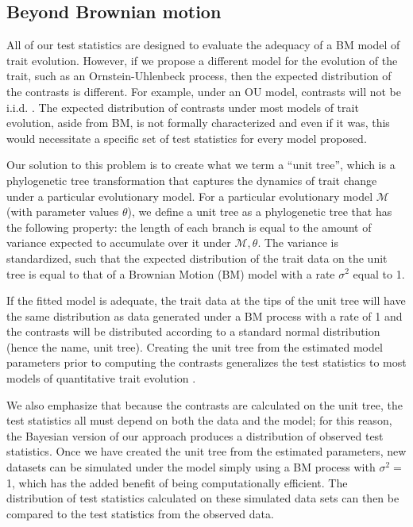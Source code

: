\subsection*{Beyond Brownian motion}

All of our test statistics are designed to evaluate the adequacy of a BM model of trait evolution. However, if we propose a different model for the evolution of the trait, such as an Ornstein-Uhlenbeck \citep[OU;][]{Hansen1997} process, then the expected distribution of the contrasts is different. For example, under an OU model, contrasts will not be i.i.d. \citep{Hansen1997}. The expected distribution of contrasts under most models of trait evolution, aside from BM, is not formally characterized and even if it was, this would necessitate a specific set of test statistics for every model proposed.

Our solution to this problem is to create what we term a ``unit tree'', which is a phylogenetic tree transformation that captures the dynamics of trait change under a particular evolutionary model. For a particular evolutionary model $\mathcal{M}$ (with parameter values $\theta$), we define a unit tree as a phylogenetic tree that has the following property: the length of each branch is equal to the amount of variance expected to accumulate over it under $\mathcal{M}, \theta$. The variance is standardized, such that the expected distribution of the trait data on the unit tree is equal to that of a Brownian Motion (BM) model with a rate $\sigma^2$ equal to 1.

If the fitted model is adequate, the trait data at the tips of the unit tree will have the same distribution as data generated under a BM process with a rate of 1 and the contrasts will be distributed according to a standard normal distribution (hence the name, unit tree). Creating the unit tree from the estimated model parameters prior to computing the contrasts generalizes the test statistics to most models of quantitative trait evolution \citep[but see][for exceptions]{Landis2012, Landispreprint}. 

We also emphasize that because the contrasts are calculated on the unit tree, the test statistics all must depend on both the data and the model; for this reason, the Bayesian version of our approach produces a distribution of observed test statistics. Once we have created the unit tree from the estimated parameters, new datasets can be simulated under the model simply using a BM process with $\sigma^2 =$ 1, which has the added benefit of being computationally efficient.  
The distribution of test statistics calculated on these simulated data sets can then be compared to the test statistics from the observed data. 

